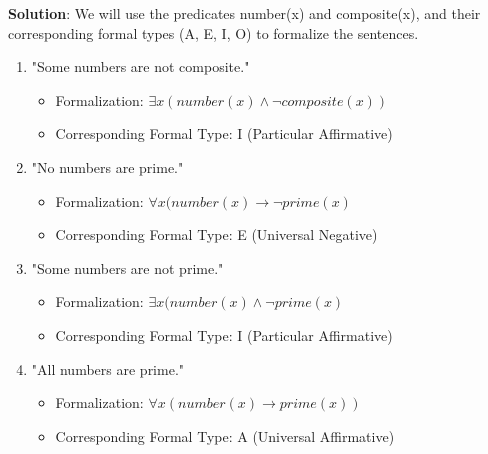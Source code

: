 \documentclass[12pt]{article}
\begin{document}
\begin{spacing}{1.5}
	\textbf{Solution}: We will use the predicates number(x) and composite(x), and their corresponding formal types (A, E, I, O) to formalize the sentences.
							
	\begin{enumerate}
		\item "Some numbers are not composite."
		      		      		      		      		      		      
		      \begin{itemize}
		      	\item Formalization: $\exists x(number(x) \land \neg composite(x))$
		      	\item Corresponding Formal Type: I (Particular Affirmative)
		      \end{itemize}
		      		      		      		      		      		        
		\item "No numbers are prime."
		      		      		      		      		      		      
		      \begin{itemize}
		      	\item Formalization: $\forall x (number(x) \rightarrow \neg prime(x)$
		      	\item Corresponding Formal Type: E (Universal Negative)
		      \end{itemize}
		      		      		      		      		      		        
		\item "Some numbers are not prime."
		      		      		      		      		      		      
		      \begin{itemize}
		      	\item Formalization: $\exists x(number(x) \land \neg prime(x)$
		      	\item Corresponding Formal Type: I (Particular Affirmative)
		      \end{itemize}
		      		      		      		      		      		        
		\item "All numbers are prime."
		      		      		      		      		      		      
		      \begin{itemize}
		      	\item Formalization: $\forall x(number(x) \rightarrow prime(x))$
		      	\item Corresponding Formal Type: A (Universal Affirmative)\\
		      \end{itemize}
		      		      		      		      		      		              

\end{enumerate}
\end{spacing}
\end{document}
